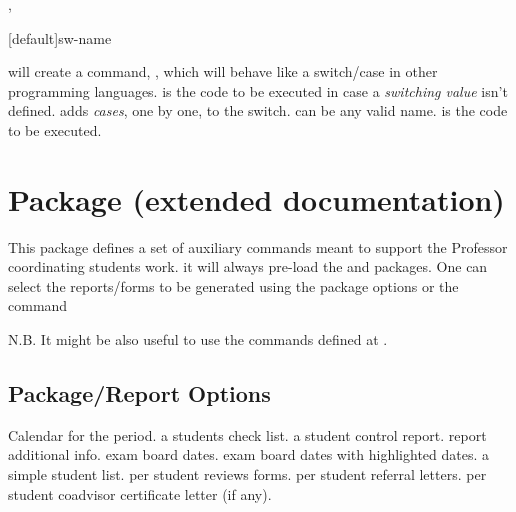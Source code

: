 \documentclass[dctools,english,tocdepth=3,secdepth=3]{ufrgscca} %
\newif\iffulldoc
\begin{document}
\begin{Macros}{\mkswitch,\addcase}
	\begin{Syntax}%
		\Macro{\mkswitch}[default]{sw-name}
	\end{Syntax}
	 will create a command, , which will behave like a switch/case in other programming languages.  is the code to be executed in case a \emph{switching value} isn't defined.
	\Macro{\addcase}{} adds \emph{cases}, one by one, to the switch.  can be any \Macro{\csname}{} valid name.  is the code to be executed.

	\begin{stcode}[st=d.switch]
		\mkswitch[\gr@depcut]\gr@case@angle
		\addcase{}
		\addcase{}
	\end{stcode}
\end{Macros}
\fi

\iffulldoc
\section{ Package (extended documentation)}
This package defines a set of auxiliary commands meant to support the Professor coordinating students work.
it will always pre-load the  and  packages. One can select the reports/forms to be generated using the package options or the command 

N.B. It might be also useful to use the commands defined at .

\subsection{Package/Report Options}\label{ufrgscca-coord.options}
\begin{Options}
	 Calendar for the period.
	 a students check list.
	 a student control report.
	 report additional info.
	 exam board dates.
	 exam board dates with highlighted dates.
	 a simple student list.
	 per student reviews forms.
	 per student referral letters.
	 per student coadvisor certificate letter (if any).
\end{Options}
\end{document}
